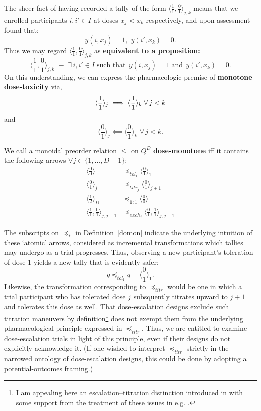 \documentclass{article}
\begin{document}
\begin{nota}
  The sheer fact of having recorded a tally of the form $\langle\frac{1}{1},\frac{0}{1}\rangle_{j,k}$ means that we enrolled participants $i, i' \in I$ at doses $x_j < x_k$ respectively, and upon assessment found that:
  $$
  y(i,x_j) = 1, \; y(i',x_k) = 0.
  $$
  Thus we may regard $\langle\frac{1}{1},\frac{0}{1}\rangle_{j,k}$ as \textbf{equivalent to a proposition:}
  $$
  \langle\frac{1}{1},\frac{0}{1}\rangle_{j,k} \; \equiv \; \exists\, i, i' \in I \;\mbox{such that}\;\, y(i,x_j) = 1 \;\mbox{and}\;\, y(i',x_k) = 0.
  $$
  On this understanding, we can express the pharmacologic premise of \textbf{monotone dose-toxicity} via,
  $$
  \langle\frac{1}{1}\rangle_j \implies \langle\frac{1}{1}\rangle_k \;\forall\, j < k \\
  $$
  and
  $$
  \langle\frac{0}{1}\rangle_j \impliedby \langle\frac{0}{1}\rangle_k \;\forall\, j < k.
  $$
\end{nota}

\begin{defn}\label{domon}
  We call a monoidal preorder relation $\le$ on $Q^D$ \textbf{dose-monotone} iff it contains the following arrows $\forall j \in \{1,...,D-1\}$:
  $$
  \begin{aligned}
    \langle\frac{0}{0}\rangle   &\preceq_{tol_1} \langle\frac{0}{1}\rangle_1 \\
    \langle\frac{0}{1}\rangle_j &\preceq_{titr_j} \langle\frac{0}{1}\rangle_{j+1} \\
    \langle\frac{1}{2}\rangle_D &\preceq_{1:1} \langle\frac{0}{0}\rangle \\
    \langle\frac{1}{1},\frac{0}{1}\rangle_{j,j+1} &\preceq_{exch_j} \langle\frac{0}{1},\frac{1}{1}\rangle_{j,j+1}
  \end{aligned}
  $$
\end{defn}

The subscripts on $\preceq_*$ in Definition~\ref{domon} indicate the underlying intuition of these `atomic' arrows, considered as incremental transformations which tallies may undergo as a trial progresses.  Thus, observing a new participant's toleration of dose 1 yields a new tally that is evidently safer:
$$
q \preceq_{tol_1} q + \langle\frac{0}{1}\rangle_1.
$$
Likewise, the transformation corresponding to $\preceq_{titr}$ would be one in which a trial participant who has tolerated dose $j$ subsquently titrates upward to $j+1$ and tolerates this dose as well.  That dose-\underline{escalation} designs exclude such titration maneuvers by definition\footnote{I am appealing here an escalation--titration distinction introduced in \cite{norris_dose_2017} with some support from the treatment of these issues in e.g. \cite{senn_statistical_2007-1}.} does not exempt them from the underlying pharmacological principle expressed in $\preceq_{titr}$.  Thus, we are entitled to examine dose-escalation trials in light of this principle, even if their designs do not explicitly acknowledge it.  (If one wished to interpret $\preceq_{titr}$ strictly in the narrowed ontology of dose-escalation designs, this could be done by adopting a potential-outcomes framing.)
\end{document}
